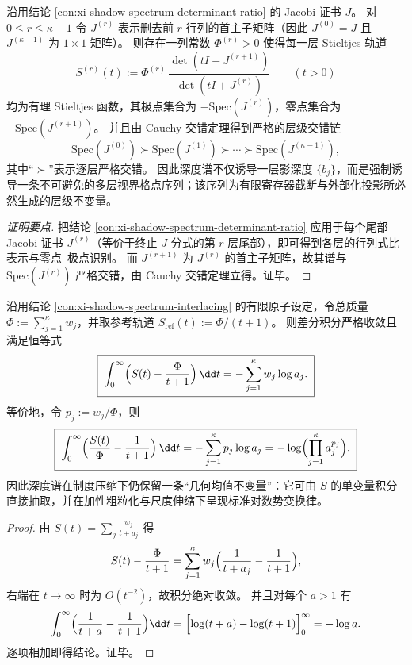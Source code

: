 \begin{proposition}\label{prop:xi-shadow-spectrum-tower-principal-minors}
沿用结论 \ref{con:xi-shadow-spectrum-determinant-ratio} 的 Jacobi 证书 \(J\)。
对 \(0\le r\le \kappa-1\) 令 \(J^{(r)}\) 表示删去前 \(r\) 行列的首主子矩阵（因此 \(J^{(0)}=J\) 且 \(J^{(\kappa-1)}\) 为 \(1\times 1\) 矩阵）。
则存在一列常数 \(\Phi^{(r)}>0\) 使得每一层 Stieltjes 轨道
\[
S^{(r)}(t):=\Phi^{(r)}\,\frac{\det(tI+J^{(r+1)})}{\det(tI+J^{(r)})}\qquad (t>0)
\]
均为有理 Stieltjes 函数，其极点集合为 \(-\mathrm{Spec}(J^{(r)})\)，零点集合为 \(-\mathrm{Spec}(J^{(r+1)})\)。
并且由 Cauchy 交错定理得到严格的层级交错链
\[
\boxed{\;
\mathrm{Spec}(J^{(0)}) \succ \mathrm{Spec}(J^{(1)}) \succ \cdots \succ \mathrm{Spec}(J^{(\kappa-1)}),\;}
\]
其中“\(\succ\)”表示逐层严格交错。
因此深度谱不仅诱导一层影深度 \(\{b_j\}\)，而是强制诱导一条不可避免的多层视界格点序列；该序列为有限寄存器截断与外部化投影所必然生成的层级不变量。
\end{proposition}
\begin{proof}[证明要点]
把结论 \ref{con:xi-shadow-spectrum-determinant-ratio} 应用于每个尾部 Jacobi 证书 \(J^{(r)}\)（等价于终止 \(J\)-分式的第 \(r\) 层尾部），即可得到各层的行列式比表示与零点--极点识别。
而 \(J^{(r+1)}\) 为 \(J^{(r)}\) 的首主子矩阵，故其谱与 \(\mathrm{Spec}(J^{(r)})\) 严格交错，由 Cauchy 交错定理立得。证毕。
\end{proof}

\begin{proposition}\label{prop:xi-logpotential-integral-geomean}
沿用结论 \ref{con:xi-shadow-spectrum-interlacing} 的有限原子设定，令总质量 \(\Phi:=\sum_{j=1}^{\kappa}w_j\)，并取参考轨道
\(
S_{\mathrm{ref}}(t):=\Phi/(t+1)
\)。
则差分积分严格收敛且满足恒等式
\[
\boxed{\;
\int_{0}^{\infty}\Bigl(S(t)-\frac{\Phi}{t+1}\Bigr)\,\dd t
=-\sum_{j=1}^{\kappa}w_j\log a_j.\;}
\]
等价地，令 \(p_j:=w_j/\Phi\)，则
\[
\boxed{\;
\int_{0}^{\infty}\Bigl(\frac{S(t)}{\Phi}-\frac{1}{t+1}\Bigr)\,\dd t
=-\sum_{j=1}^{\kappa}p_j\log a_j
=-\log\Bigl(\prod_{j=1}^{\kappa}a_j^{p_j}\Bigr).\;}
\]
因此深度谱在制度压缩下仍保留一条“几何均值不变量”：它可由 \(S\) 的单变量积分直接抽取，并在加性粗粒化与尺度伸缩下呈现标准对数势变换律。
\end{proposition}
\begin{proof}
由 \(S(t)=\sum_j\frac{w_j}{t+a_j}\) 得
\[
S(t)-\frac{\Phi}{t+1}
=\sum_{j=1}^{\kappa}w_j\Bigl(\frac{1}{t+a_j}-\frac{1}{t+1}\Bigr),
\]
右端在 \(t\to\infty\) 时为 \(O(t^{-2})\)，故积分绝对收敛。
并且对每个 \(a>1\) 有
\[
\int_0^\infty\Bigl(\frac{1}{t+a}-\frac{1}{t+1}\Bigr)\dd t
=\Bigl[\log(t+a)-\log(t+1)\Bigr]_{0}^{\infty}
=-\log a.
\]
逐项相加即得结论。证毕。
\end{proof}

